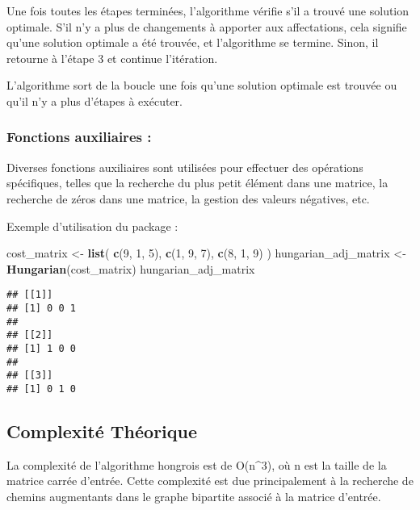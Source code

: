 \documentclass[
]{article}
\newenvironment{Shaded}{\begin{snugshade}}{\end{snugshade}}
\newcommand{\DecValTok}[1]{\textcolor[rgb]{0.00,0.00,0.81}{#1}}
\newcommand{\FunctionTok}[1]{\textcolor[rgb]{0.13,0.29,0.53}{\textbf{#1}}}
\newcommand{\NormalTok}[1]{#1}
\newcommand{\OtherTok}[1]{\textcolor[rgb]{0.56,0.35,0.01}{#1}}
\begin{document}
Une fois toutes les étapes terminées, l'algorithme vérifie s'il a trouvé
une solution optimale. S'il n'y a plus de changements à apporter aux
affectations, cela signifie qu'une solution optimale a été trouvée, et
l'algorithme se termine. Sinon, il retourne à l'étape 3 et continue
l'itération.

L'algorithme sort de la boucle une fois qu'une solution optimale est
trouvée ou qu'il n'y a plus d'étapes à exécuter.

\hypertarget{fonctions-auxiliaires}{%
\subsubsection{Fonctions auxiliaires :}\label{fonctions-auxiliaires}}

Diverses fonctions auxiliaires sont utilisées pour effectuer des
opérations spécifiques, telles que la recherche du plus petit élément
dans une matrice, la recherche de zéros dans une matrice, la gestion des
valeurs négatives, etc.

Exemple d'utilisation du package :

\begin{Shaded}
\begin{Highlighting}[]
\NormalTok{cost\_matrix }\OtherTok{\textless{}{-}} \FunctionTok{list}\NormalTok{(}
  \FunctionTok{c}\NormalTok{(}\DecValTok{9}\NormalTok{, }\DecValTok{1}\NormalTok{, }\DecValTok{5}\NormalTok{),}
  \FunctionTok{c}\NormalTok{(}\DecValTok{1}\NormalTok{, }\DecValTok{9}\NormalTok{, }\DecValTok{7}\NormalTok{),}
  \FunctionTok{c}\NormalTok{(}\DecValTok{8}\NormalTok{, }\DecValTok{1}\NormalTok{, }\DecValTok{9}\NormalTok{)}
\NormalTok{)}
\NormalTok{hungarian\_adj\_matrix }\OtherTok{\textless{}{-}} \FunctionTok{Hungarian}\NormalTok{(cost\_matrix)}
\NormalTok{hungarian\_adj\_matrix}
\end{Highlighting}
\end{Shaded}

\begin{verbatim}
## [[1]]
## [1] 0 0 1
## 
## [[2]]
## [1] 1 0 0
## 
## [[3]]
## [1] 0 1 0
\end{verbatim}

\hypertarget{complexituxe9-thuxe9orique-1}{%
\subsection{Complexité Théorique}\label{complexituxe9-thuxe9orique-1}}

La complexité de l'algorithme hongrois est de O(n\^{}3), où n est la
taille de la matrice carrée d'entrée. Cette complexité est due
principalement à la recherche de chemins augmentants dans le graphe
bipartite associé à la matrice d'entrée.
\end{document}
